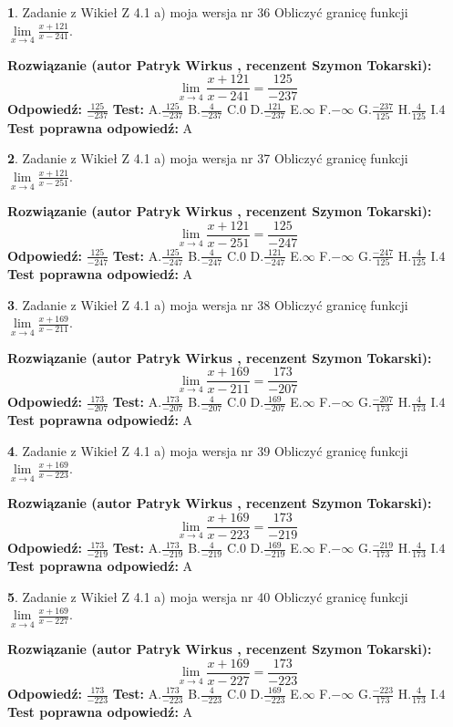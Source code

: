 \documentclass[12pt, a4paper]{article}
\theoremstyle{definition} %
\newtheorem{zad}{}
\newcommand{\zadStart}[1]{\begin{zad}#1\newline}
\newcommand{\zadStop}{\end{zad}}
\newcommand{\rozwStart}[2]{\noindent \textbf{Rozwiązanie (autor #1 , recenzent #2): }\newline}
\newcommand{\rozwStop}{\newline}
\newcommand{\odpStart}{\noindent \textbf{Odpowiedź:}\newline}
\newcommand{\odpStop}{\newline}
\newcommand{\testStart}{\noindent \textbf{Test:}\newline}
\newcommand{\testStop}{\newline}
\newcommand{\kluczStart}{\noindent \textbf{Test poprawna odpowiedź:}\newline}
\newcommand{\kluczStop}{\newline}
\begin{document}
\zadStart{Zadanie z Wikieł Z 4.1 a) moja wersja nr 36}
Obliczyć granicę funkcji $\lim\limits_{x\to4}\frac{x+121}{x-241}$.
\zadStop
\rozwStart{Patryk Wirkus}{Szymon Tokarski}
$$\lim\limits_{x\to4}\frac{x+121}{x-241} = \frac{125}{-237}$$
\rozwStop
\odpStart
$\frac{125}{-237}$
\odpStop
\testStart
A.$\frac{125}{-237}$
B.$\frac{4}{-237}$
C.$0$
D.$\frac{121}{-237}$
E.$\infty$
F.$-\infty$
G.$\frac{-237}{125}$
H.$\frac{4}{125}$
I.$4$
\testStop
\kluczStart
A
\kluczStop



\zadStart{Zadanie z Wikieł Z 4.1 a) moja wersja nr 37}
Obliczyć granicę funkcji $\lim\limits_{x\to4}\frac{x+121}{x-251}$.
\zadStop
\rozwStart{Patryk Wirkus}{Szymon Tokarski}
$$\lim\limits_{x\to4}\frac{x+121}{x-251} = \frac{125}{-247}$$
\rozwStop
\odpStart
$\frac{125}{-247}$
\odpStop
\testStart
A.$\frac{125}{-247}$
B.$\frac{4}{-247}$
C.$0$
D.$\frac{121}{-247}$
E.$\infty$
F.$-\infty$
G.$\frac{-247}{125}$
H.$\frac{4}{125}$
I.$4$
\testStop
\kluczStart
A
\kluczStop



\zadStart{Zadanie z Wikieł Z 4.1 a) moja wersja nr 38}
Obliczyć granicę funkcji $\lim\limits_{x\to4}\frac{x+169}{x-211}$.
\zadStop
\rozwStart{Patryk Wirkus}{Szymon Tokarski}
$$\lim\limits_{x\to4}\frac{x+169}{x-211} = \frac{173}{-207}$$
\rozwStop
\odpStart
$\frac{173}{-207}$
\odpStop
\testStart
A.$\frac{173}{-207}$
B.$\frac{4}{-207}$
C.$0$
D.$\frac{169}{-207}$
E.$\infty$
F.$-\infty$
G.$\frac{-207}{173}$
H.$\frac{4}{173}$
I.$4$
\testStop
\kluczStart
A
\kluczStop



\zadStart{Zadanie z Wikieł Z 4.1 a) moja wersja nr 39}
Obliczyć granicę funkcji $\lim\limits_{x\to4}\frac{x+169}{x-223}$.
\zadStop
\rozwStart{Patryk Wirkus}{Szymon Tokarski}
$$\lim\limits_{x\to4}\frac{x+169}{x-223} = \frac{173}{-219}$$
\rozwStop
\odpStart
$\frac{173}{-219}$
\odpStop
\testStart
A.$\frac{173}{-219}$
B.$\frac{4}{-219}$
C.$0$
D.$\frac{169}{-219}$
E.$\infty$
F.$-\infty$
G.$\frac{-219}{173}$
H.$\frac{4}{173}$
I.$4$
\testStop
\kluczStart
A
\kluczStop



\zadStart{Zadanie z Wikieł Z 4.1 a) moja wersja nr 40}
Obliczyć granicę funkcji $\lim\limits_{x\to4}\frac{x+169}{x-227}$.
\zadStop
\rozwStart{Patryk Wirkus}{Szymon Tokarski}
$$\lim\limits_{x\to4}\frac{x+169}{x-227} = \frac{173}{-223}$$
\rozwStop
\odpStart
$\frac{173}{-223}$
\odpStop
\testStart
A.$\frac{173}{-223}$
B.$\frac{4}{-223}$
C.$0$
D.$\frac{169}{-223}$
E.$\infty$
F.$-\infty$
G.$\frac{-223}{173}$
H.$\frac{4}{173}$
I.$4$
\testStop
\kluczStart
A
\kluczStop
\end{document}
